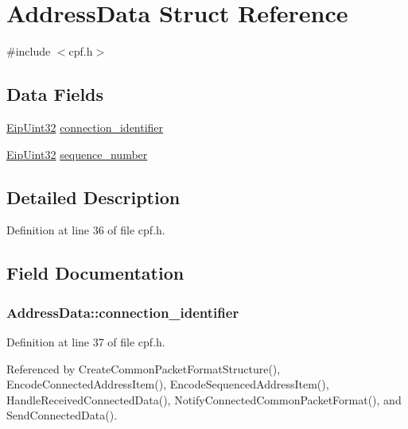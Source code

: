 \hypertarget{structAddressData}{\section{\-Address\-Data \-Struct \-Reference}
\label{d9/da2/structAddressData}
}


{\ttfamily \#include $<$cpf.\-h$>$}

\subsection*{\-Data \-Fields}
\begin{DoxyCompactItemize}
\item 
\hyperlink{typedefs_8h_abf2dd49262551294eb990ef8746a2767}{\-Eip\-Uint32} \hyperlink{structAddressData_a955e0fc2a462a58b78f0da83df66a307}{connection\-\_\-identifier}
\item 
\hyperlink{typedefs_8h_abf2dd49262551294eb990ef8746a2767}{\-Eip\-Uint32} \hyperlink{structAddressData_a41d4480ab2d89c04cd9211586be88ba5}{sequence\-\_\-number}
\end{DoxyCompactItemize}


\subsection{\-Detailed \-Description}


\-Definition at line 36 of file cpf.\-h.



\subsection{\-Field \-Documentation}
\hypertarget{structAddressData_a955e0fc2a462a58b78f0da83df66a307}{
\subsubsection[{connection\-\_\-identifier}]{ {\bf \-Address\-Data\-::connection\-\_\-identifier}}}\label{d9/da2/structAddressData_a955e0fc2a462a58b78f0da83df66a307}


\-Definition at line 37 of file cpf.\-h.



\-Referenced by \-Create\-Common\-Packet\-Format\-Structure(), \-Encode\-Connected\-Address\-Item(), \-Encode\-Sequenced\-Address\-Item(), \-Handle\-Received\-Connected\-Data(), \-Notify\-Connected\-Common\-Packet\-Format(), and \-Send\-Connected\-Data().

